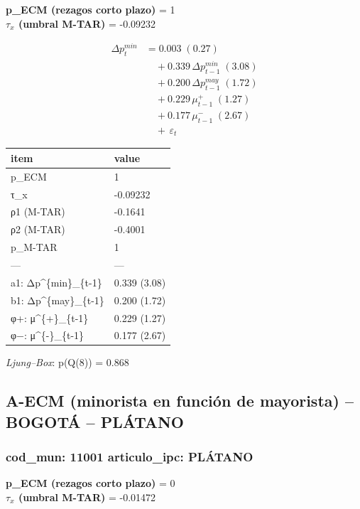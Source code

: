 \documentclass[
  12pt,
]{article}
\begin{document}
\textbf{p\_ECM (rezagos corto plazo)} = 1\\
\textbf{\(\tau_x\) (umbral M-TAR)} = -0.09232

\[
\begin{aligned}
\Delta p^{min}_{t} &= 0.003\;(0.27) \\
&\quad + 0.339\,\Delta p^{min}_{t-1}\;(3.08) \\
&\quad + 0.200\,\Delta p^{may}_{t-1}\;(1.72) \\
&\quad + 0.229\,\mu^{+}_{t-1}\;(1.27) \\
&\quad + 0.177\,\mu^{-}_{t-1}\;(2.67) \\
&\quad +\, \varepsilon_t
\end{aligned}
\]

\begin{longtable}[t]{ll}
\toprule
item & value\\
\midrule
p\_ECM & 1\\
τ\_x & -0.09232\\
ρ1 (M-TAR) & -0.1641\\
ρ2 (M-TAR) & -0.4001\\
p\_M-TAR & 1\\
\addlinespace
— & —\\
a1: Δp\textasciicircum{}\{min\}\_\{t-1\} & 0.339 (3.08)\\
b1: Δp\textasciicircum{}\{may\}\_\{t-1\} & 0.200 (1.72)\\
φ+: μ\textasciicircum{}\{+\}\_\{t-1\} & 0.229 (1.27)\\
φ−: μ\textasciicircum{}\{-\}\_\{t-1\} & 0.177 (2.67)\\
\bottomrule
\end{longtable}

\emph{Ljung--Box}: p(Q(8)) = 0.868

\subsection{A-ECM (minorista en función de mayorista) -- BOGOTÁ --
PLÁTANO}\label{a-ecm-minorista-en-funciuxf3n-de-mayorista-bogotuxe1-pluxe1tano}

\subsubsection{cod\_mun: 11001 \textbar{} articulo\_ipc:
PLÁTANO}\label{cod_mun-11001-articulo_ipc-pluxe1tano}

\textbf{p\_ECM (rezagos corto plazo)} = 0\\
\textbf{\(\tau_x\) (umbral M-TAR)} = -0.01472
\end{document}
